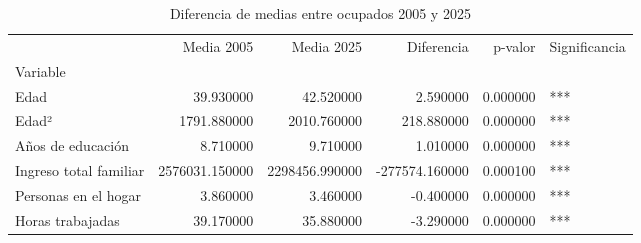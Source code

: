 \begin{table}
\caption{Diferencia de medias entre ocupados 2005 y 2025}
\label{tab:diff_medias}
\begin{tabular}{lrrrrl}
\toprule
 & Media 2005 & Media 2025 & Diferencia & p-valor & Significancia \\
Variable &  &  &  &  &  \\
\midrule
Edad & 39.930000 & 42.520000 & 2.590000 & 0.000000 & *** \\
Edad² & 1791.880000 & 2010.760000 & 218.880000 & 0.000000 & *** \\
Años de educación & 8.710000 & 9.710000 & 1.010000 & 0.000000 & *** \\
Ingreso total familiar & 2576031.150000 & 2298456.990000 & -277574.160000 & 0.000100 & *** \\
Personas en el hogar & 3.860000 & 3.460000 & -0.400000 & 0.000000 & *** \\
Horas trabajadas & 39.170000 & 35.880000 & -3.290000 & 0.000000 & *** \\
\bottomrule
\end{tabular}
\end{table}
